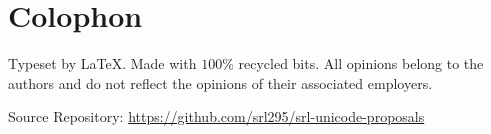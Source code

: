 \documentclass[12pt]{article}
\begin{document}

{}
\printbibliography
\section*{Colophon}

Typeset by \LaTeX . Made with \( 100\%  \) recycled bits.
All opinions belong to the authors and do not reflect the opinions
of their associated employers.

Source Repository: \small\url{https://github.com/srl295/srl-unicode-proposals}
\end{document}
